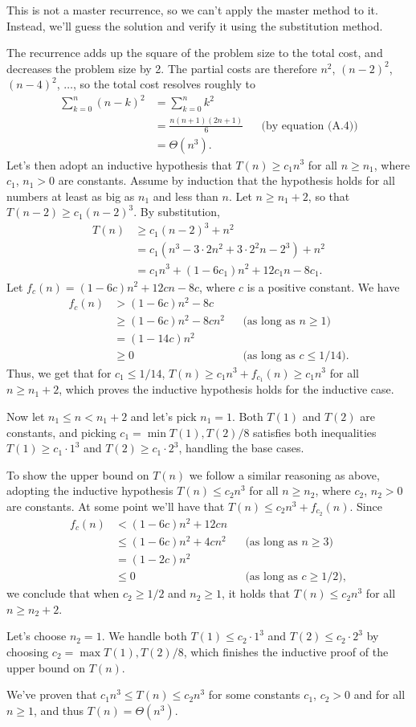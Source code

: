 This is not a master recurrence, so we can't apply the master method to it.
Instead, we'll guess the solution and verify it using the substitution method.

The recurrence adds up the square of the problem size to the total cost, and decreases the problem size by 2.
The partial costs are therefore $n^2$, $(n-2)^2$, $(n-4)^2$, $\dots$, so the total cost resolves roughly to
\begin{align*}
    \sum_{k=0}^n(n-k)^2 &= \sum_{k=0}^nk^2 \\[1mm]
    &= \frac{n(n+1)(2n+1)}{6} && \text{(by equation (A.4))} \\
    &= \Theta(n^3).
\end{align*}
Let's then adopt an inductive hypothesis that $T(n)\ge c_1n^3$ for all $n\ge n_1$, where $c_1$, $n_1>0$ are constants.
Assume by induction that the hypothesis holds for all numbers at least as big as $n_1$ and less than $n$.
Let $n\ge n_1+2$, so that $T(n-2)\ge c_1(n-2)^3$.
By substitution,
\begin{align*}
    T(n) &\ge c_1(n-2)^3+n^2 \\
    &= c_1(n^3-3\cdot2n^2+3\cdot2^2n-2^3)+n^2 \\
    &= c_1n^3+(1-6c_1)n^2+12c_1n-8c_1.
\end{align*}
Let $f_c(n)=(1-6c)n^2+12cn-8c$, where $c$ is a positive constant.
We have
\begin{align*}
    f_c(n) &> (1-6c)n^2-8c \\
    &\ge (1-6c)n^2-8cn^2 && \text{(as long as $n\ge1$)} \\
    &= (1-14c)n^2 \\
    &\ge 0 && \text{(as long as $c\le1/14$)}.
\end{align*}
Thus, we get that for $c_1\le1/14$, $T(n)\ge c_1n^3+f_{c_1}(n)\ge c_1n^3$ for all $n\ge n_1+2$, which proves the inductive hypothesis holds for the inductive case.

Now let $n_1\le n<n_1+2$ and let's pick $n_1=1$.
Both $T(1)$ and $T(2)$ are constants, and picking $c_1=\min{T(1),T(2)/8}$ satisfies both inequalities $T(1)\ge c_1\cdot1^3$ and $T(2)\ge c_1\cdot2^3$, handling the base cases.

To show the upper bound on $T(n)$ we follow a similar reasoning as above, adopting the inductive hypothesis $T(n)\le c_2n^3$ for all $n\ge n_2$, where $c_2$, $n_2>0$ are constants.
At some point we'll have that $T(n)\le c_2n^3+f_{c_2}(n)$.
Since
\begin{align*}
    f_c(n) &< (1-6c)n^2+12cn \\
    &\le (1-6c)n^2+4cn^2 && \text{(as long as $n\ge3$)} \\
    &= (1-2c)n^2 \\
    &\le 0 && \text{(as long as $c\ge1/2$)},
\end{align*}
we conclude that when $c_2\ge1/2$ and $n_2\ge1$, it holds that $T(n)\le c_2n^3$ for all $n\ge n_2+2$.

Let's choose $n_2=1$.
We handle both $T(1)\le c_2\cdot1^3$ and $T(2)\le c_2\cdot2^3$ by choosing $c_2=\max{T(1),T(2)/8}$, which finishes the inductive proof of the upper bound on $T(n)$.

We've proven that $c_1n^3\le T(n)\le c_2n^3$ for some constants $c_1$, $c_2>0$ and for all $n\ge1$, and thus $T(n)=\Theta(n^3)$.
